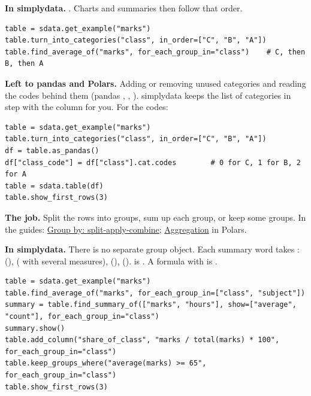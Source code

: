 \textbf{In simplydata.} . Charts and summaries
then follow that order.

\begin{lstlisting}[style=py]
table = sdata.get_example("marks")
table.turn_into_categories("class", in_order=["C", "B", "A"])
table.find_average_of("marks", for_each_group_in="class")    # C, then B, then A
\end{lstlisting}

\textbf{Left to pandas and Polars.} Adding or removing unused categories and reading the codes behind
them (pandas , , ). simplydata
keeps the list of categories in step with the column for you. For the codes:

\begin{lstlisting}[style=py]
table = sdata.get_example("marks")
table.turn_into_categories("class", in_order=["C", "B", "A"])
df = table.as_pandas()
df["class_code"] = df["class"].cat.codes        # 0 for C, 1 for B, 2 for A
table = sdata.table(df)
table.show_first_rows(3)
\end{lstlisting}


\textbf{The job.} Split the rows into groups, sum up each group, or keep some groups. In the guides:
\href{https://pandas.pydata.org/docs/user_guide/groupby.html}{Group by: split-apply-combine};
\href{https://docs.pola.rs/user-guide/expressions/aggregation/}{Aggregation} in Polars.

\textbf{In simplydata.} There is no separate group object. Each summary word takes
:  (),
 ( with several measures),  (),
 ().  is . A
formula with  is .

\begin{lstlisting}[style=py]
table = sdata.get_example("marks")
table.find_average_of("marks", for_each_group_in=["class", "subject"])
summary = table.find_summary_of(["marks", "hours"], show=["average", "count"], for_each_group_in="class")
summary.show()
table.add_column("share_of_class", "marks / total(marks) * 100", for_each_group_in="class")
table.keep_groups_where("average(marks) >= 65", for_each_group_in="class")
table.show_first_rows(3)
\end{lstlisting}

